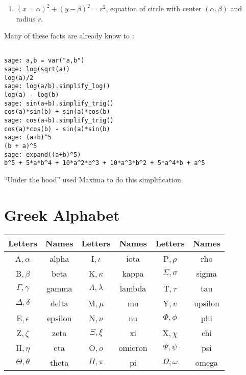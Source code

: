 \begin{enumerate}
\item
$\left(x = \alpha\right)^2 + \left(y - \beta\right)^2 = r^2$, equation of circle with center $\left(\alpha,\beta\right)$ and radius $r$.

\end{enumerate}

Many of these facts are already know to \SAGE:

\begin{Verbatim}[fontsize=\scriptsize,fontfamily=courier,fontshape=tt,frame=single,label=\SAGE]

sage: a,b = var("a,b")
sage: log(sqrt(a))
log(a)/2
sage: log(a/b).simplify_log()
log(a) - log(b)
sage: sin(a+b).simplify_trig()
cos(a)*sin(b) + sin(a)*cos(b)
sage: cos(a+b).simplify_trig()
cos(a)*cos(b) - sin(a)*sin(b)
sage: (a+b)^5
(b + a)^5
sage: expand((a+b)^5)
b^5 + 5*a*b^4 + 10*a^2*b^3 + 10*a^3*b^2 + 5*a^4*b + a^5

\end{Verbatim}

\noindent
``Under the hood'' \SAGE used Maxima to do this simplification.

\section{Greek Alphabet}
\label{sec:01:02}

\begin{center}
\begin{tabular}{cc|cc|cc}
{\bf Letters}     & {\bf Names} & {\bf Letters}     & {\bf Names} & {\bf Letters}   & {\bf Names} \\ \hline
A$,\alpha$        & alpha       & I$,\iota$         & iota        & P$,\rho$        & rho         \\
B$,\beta$         & beta        & K$,\kappa$        & kappa       & $\Sigma,\sigma$ & sigma       \\
$\Gamma, \gamma$  & gamma       & $\Lambda,\lambda$ & lambda      & T$,\tau$        & tau         \\
$\Delta,\delta$   & delta       & M$,\mu$           & mu          & Y$,\upsilon$    & upsilon     \\
E$,\epsilon$      & epsilon     & N$, \nu$          & nu          & $\Phi,\phi$     & phi         \\
Z$,\zeta$         & zeta        & $\Xi,\xi$         & xi          & X$,\chi$        & chi         \\
H$,\eta$          & eta         & O$,o$             & omicron     & $\Psi,\psi$     & psi         \\
$\Theta,\theta$   & theta       & $\Pi,\pi$         & pi          & $\Omega,\omega$ & omega       \\
\end{tabular}
\end{center}

